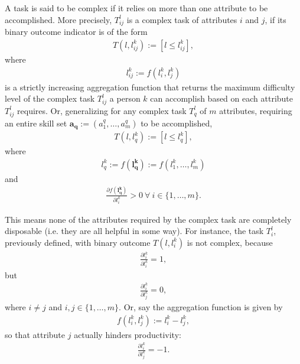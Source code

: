 \documentclass[hidelinks, nonatbib]{elsarticle}
\begin{document}
\begin{definition}
    \label{complex_task}
    A task is said to be complex if it relies on more than one attribute to be accomplished. More precisely, $T_{ij}^{l}$ is a complex task of attributes $i$ and $j$, if its binary outcome indicator is of the form
    \begin{gather}
        T(l, l_{ij}^{k})
        :=
        [l \leq l_{ij}^{k}],
    \end{gather}
    where
    \begin{gather}
        l_{ij}^{k} := f(l_{i}^{k}, l_{j}^{k})
    \end{gather}
    is a strictly increasing aggregation function that returns the maximum difficulty level of the complex task $T_{ij}^{l}$ a person $k$ can accomplish based on each attribute $T_{ij}^{l}$ requires. Or, generalizing for any complex task $T_{q}^{l}$ of $m$ attributes, requiring an entire skill set $\boldsymbol{a_q} := (a_{1}^{q}, \dots, a_{m}^{q})$ to be accomplished, 
    \begin{gather}
        T(l, l_{q}^{k})
        :=
        [l \leq l_{q}^{k}],
    \end{gather}
    where
    \begin{gather}
        l_{q}^{k}
        := 
        f(\boldsymbol{l_{q}^{k}})
        :=
        f(l_{1}^{k}, \dots, l_{m}^{k})
    \end{gather}
    and 
    \begin{gather}
        \frac{
            \partial
            f(\boldsymbol{l_{q}^{k}})
        }{
            \partial 
            l_{i}^{k}
        } > 0
        \
        \forall 
        \
        i \in \{1, \dots, m\}
        .
    \end{gather}
        
    This means none of the attributes required by the complex task are completely disposable (i.e. they are all helpful in some way). For instance, the task $T_{i}^{l}$, previously defined, with binary outcome $T(l, l_{i}^{k})$ is not complex, because
    \begin{gather}
        \frac{
            \partial
            l_{i}^{k}
        }{
            \partial 
            l_{i}^{k}
        } = 1
        ,
    \end{gather}
    but
    \begin{gather}
        \frac{
            \partial
            l_{i}^{k}
        }{
            \partial 
            l_{j}^{k}
        } = 0
        , 
    \end{gather}
    where $i \neq j$ and $i, j \in \{1, \dots, m\}$. Or, say the aggregation function is given by
    \begin{gather}
        f(l_{i}^{k}, l_{j}^{k})
        := 
        l_{i}^{k} - l_{j}^{k}
        ,
    \end{gather}
    so that attribute $j$ actually hinders productivity:
    \begin{gather}
        \frac{
            \partial
            l_{i}^{k}
        }{
            \partial 
            l_{j}^{k}
        } = -1
        .
    \end{gather}
        

\end{definition}
\end{document}

